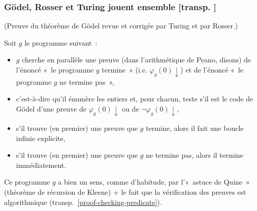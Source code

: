 \documentclass[mathserif,a4paper,aspectratio=169]{beamer}
\renewcommand{\frametitle}[1]{\subsubsection*{#1 {\footnotesize[transp. \insertframenumber]}}}
\begin{document}
%
\begin{frame}
\frametitle{Gödel, Rosser et Turing jouent ensemble}

{\footnotesize (Preuve du théorème de Gödel revue et corrigée par
  Turing et par Rosser.)\par}

\medskip

Soit $g$ le programme suivant :
\begin{itemize}
\item $g$ cherche en parallèle une preuve (dans l'arithmétique de
  Peano, disons) de l'énoncé « le programme $g$ termine »
  (i.e. $\varphi_g(0){\downarrow}$) et de l'énoncé « le programme $g$
  ne termine pas »,
\item c'est-à-dire qu'il énumère les entiers et, pour chacun, teste
  s'il est le code de Gödel d'une preuve de $\varphi_g(0){\downarrow}$
  ou de $\neg\varphi_g(0){\downarrow}$,
\item s'il trouve (en premier) une preuve que $g$ termine, alors il
  fait une boucle infinie explicite,
\item s'il trouve (en premier) une preuve que $g$ ne termine pas,
  alors il termine immédiatement.
\end{itemize}

\smallskip

Ce programme $g$ a bien un sens, comme d'habitude, par l'« astuce de
Quine » (théorème de récursion de Kleene) + le fait que la
vérification des preuves est algorithmique
(transp. \ref{proof-checking-predicate}).

\end{frame}
%
\end{document}
